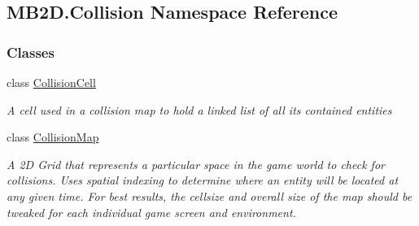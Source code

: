 \hypertarget{namespace_m_b2_d_1_1_collision}{}\subsection{M\+B2\+D.\+Collision Namespace Reference}
\label{namespace_m_b2_d_1_1_collision}
\subsubsection*{Classes}
\begin{DoxyCompactItemize}
\item 
class \hyperlink{class_m_b2_d_1_1_collision_1_1_collision_cell}{Collision\+Cell}
\begin{DoxyCompactList}\small\item\em A cell used in a collision map to hold a linked list of all its contained entities \end{DoxyCompactList}\item 
class \hyperlink{class_m_b2_d_1_1_collision_1_1_collision_map}{Collision\+Map}
\begin{DoxyCompactList}\small\item\em A 2D Grid that represents a particular space in the game world to check for collisions. Uses spatial indexing to determine where an entity will be located at any given time. For best results, the cellsize and overall size of the map should be tweaked for each individual game screen and environment. \end{DoxyCompactList}\end{DoxyCompactItemize}
